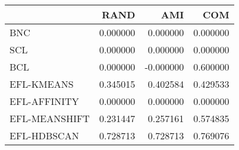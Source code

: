 \begin{tabular}{lrrr}
\toprule
 & RAND & AMI & COM \\
\midrule
BNC & 0.000000 & 0.000000 & 0.000000 \\
SCL & 0.000000 & 0.000000 & 0.000000 \\
BCL & 0.000000 & -0.000000 & 0.600000 \\
EFL-KMEANS & 0.345015 & 0.402584 & 0.429533 \\
EFL-AFFINITY & 0.000000 & 0.000000 & 0.000000 \\
EFL-MEANSHIFT & 0.231447 & 0.257161 & 0.574835 \\
EFL-HDBSCAN & 0.728713 & 0.728713 & 0.769076 \\
\bottomrule
\end{tabular}
